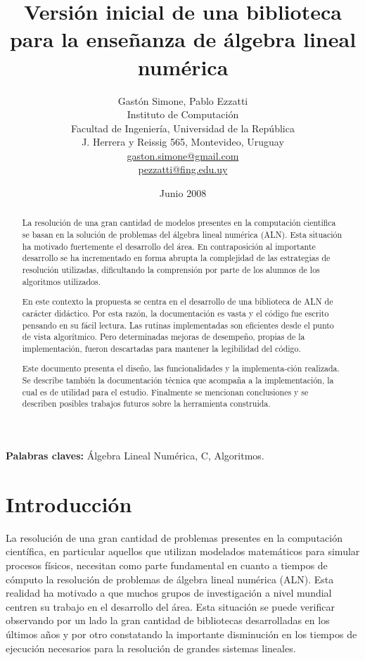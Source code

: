 \documentclass[a4paper,10pt]{article}
\title{Versión inicial de una biblioteca para la enseñanza de álgebra lineal numérica}
\author{Gastón Simone, Pablo Ezzatti\vspace{0.5cm} \\ Instituto de Computación\\ Facultad de Ingeniería, Universidad de la República\\ J. Herrera y Reissig 565, Montevideo, Uruguay\\ \url{gaston.simone@gmail.com}\\ \url{pezzatti@fing.edu.uy}}
\date{Junio 2008}
\begin{document}
\maketitle

\textbf{Palabras claves:} Álgebra Lineal Numérica, C, Algoritmos.

\begin{abstract}
La resolución de una gran cantidad de modelos presentes en la computación científica se basan en la solución de problemas del álgebra lineal numérica (ALN). 
Esta situación ha motivado fuertemente el desarrollo del área.
En contraposición al importante desarrollo se ha incrementado en forma abrupta la complejidad de las estrategias de resolución utilizadas, dificultando la comprensión por parte de los alumnos de los algoritmos utilizados.

En este contexto la propuesta se centra en el desarrollo de una biblioteca de ALN de carácter didáctico. 
Por esta razón, la documentación es vasta y el código fue escrito pensando en su fácil lectura. Las rutinas implementadas son eficientes desde el punto de vista algorítmico. 
Pero determinadas mejoras de desempeño, propias de la implementación, fueron descartadas para mantener la legibilidad del código.

Este documento presenta el diseño, las funcionalidades y la implementa-ción realizada.
Se describe también la documentación técnica que acompaña a la implementación, la cual es de utilidad para el estudio. 
Finalmente se mencionan conclusiones y se describen posibles trabajos futuros sobre la herramienta construida.
\end{abstract}

\newpage


\section{Introducción}

La resolución de una  gran cantidad de problemas presentes en la computación científica, en particular aquellos que utilizan modelados matemáticos para simular procesos físicos, necesitan como parte fundamental en cuanto a tiempos de cómputo la resolución de problemas de álgebra lineal numérica (ALN).
Esta realidad ha motivado a que muchos grupos de investigación a nivel mundial centren su trabajo en el desarrollo del área. 
Esta situación se puede verificar observando por un lado la gran cantidad de bibliotecas desarrolladas en los últimos años y por otro constatando la importante disminución en los tiempos de ejecución necesarios para la resolución de grandes sistemas lineales.
 
\end{document}
